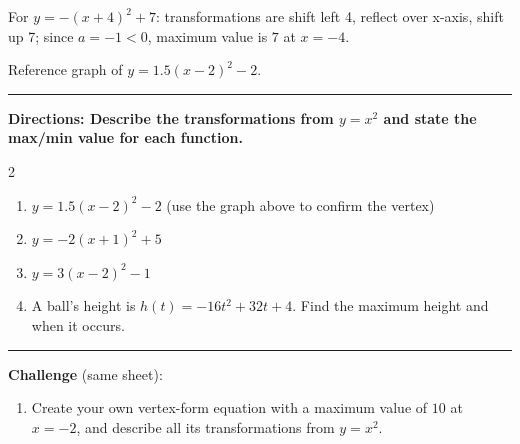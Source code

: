 \documentclass[12pt]{article}
\begin{document}
For $y=-(x+4)^2+7$: transformations are shift left 4, reflect over x-axis, shift up 7; since $a=-1<0$, maximum value is $7$ at $x=-4$.

\begin{center}\end{center}
{\small\centering Reference graph of $y=1.5(x-2)^2-2$.\par}
\vspace{0.2cm}\hrule\vspace{0.35cm}
\textbf{Directions: Describe the transformations from $y=x^2$ and state the max/min value for each function.}

\begin{multicols}{2}
\begin{enumerate}[label=\textbf{\arabic*.}, start=5, itemsep=3cm]
  \item $y=1.5(x-2)^2-2$ (use the graph above to confirm the vertex)
  \item $\displaystyle y=-2(x+1)^2+5$
  \item $\displaystyle y=3(x-2)^2-1$
  \item A ball's height is $h(t)=-16t^2+32t+4$. Find the maximum height and when it occurs.
\end{enumerate}
\end{multicols}

\vspace{0.2cm}\hrule\vspace{0.3cm}
\textbf{Challenge} (same sheet):\\[4pt]
\begin{enumerate}[label=\textbf{\arabic*.}, start=9, itemsep=2.2cm]
  \item Create your own vertex-form equation with a maximum value of $10$ at $x=-2$, and describe all its transformations from $y=x^2$.
\end{enumerate}

\newpage
\end{document}
